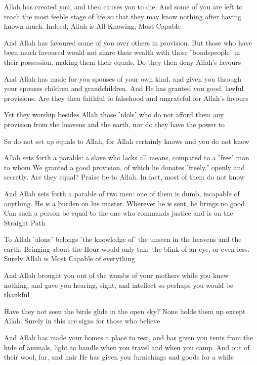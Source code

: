 Allah has created you, and then causes you to die. And some of you are left to reach the most feeble stage of life so that they may know nothing after having known much. Indeed, Allah is All-Knowing, Most Capable

And Allah has favoured some of you over others in provision. But those who have been much favoured would not share their wealth with those ˹bondspeople˺ in their possession, making them their equals. Do they then deny Allah’s favours

And Allah has made for you spouses of your own kind, and given you through your spouses children and grandchildren. And He has granted you good, lawful provisions. Are they then faithful to falsehood and ungrateful for Allah’s favours

Yet they worship besides Allah those ˹idols˺ who do not afford them any provision from the heavens and the earth, nor do they have the power to

So do not set up equals to Allah, for Allah certainly knows and you do not know

Allah sets forth a parable: a slave who lacks all means, compared to a ˹free˺ man to whom We granted a good provision, of which he donates ˹freely,˺ openly and secretly. Are they equal? Praise be to Allah. In fact, most of them do not know

And Allah sets forth a parable of two men: one of them is dumb, incapable of anything. He is a burden on his master. Wherever he is sent, he brings no good. Can such a person be equal to the one who commands justice and is on the Straight Path

To Allah ˹alone˺ belongs ˹the knowledge of˺ the unseen in the heavens and the earth. Bringing about the Hour would only take the blink of an eye, or even less. Surely Allah is Most Capable of everything

And Allah brought you out of the wombs of your mothers while you knew nothing, and gave you hearing, sight, and intellect so perhaps you would be thankful

Have they not seen the birds glide in the open sky? None holds them up except Allah. Surely in this are signs for those who believe

And Allah has made your homes a place to rest, and has given you tents from the hide of animals, light to handle when you travel and when you camp. And out of their wool, fur, and hair He has given you furnishings and goods for a while

